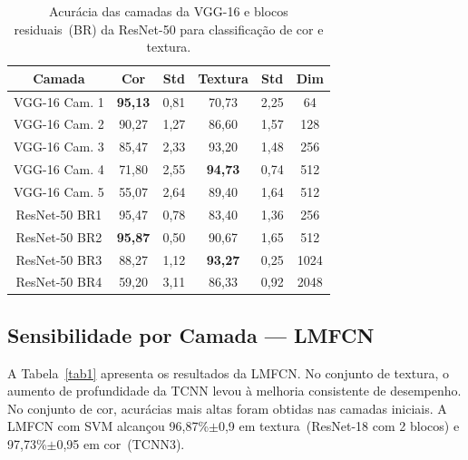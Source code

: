 \documentclass[letterpaper, 10 pt, conference]{ieeeconf}
\begin{document}
\begin{table}[htbp]
\caption{Acurácia das camadas da VGG-16 e blocos residuais~(BR) da ResNet-50
         para classificação de cor e textura.}
\begin{center}
\begin{tabular}{c|c|c|c|c|c}
\hline
\textbf{Camada} & \textbf{Cor} & \textbf{Std} & \textbf{Textura}
                & \textbf{Std} & \textbf{Dim} \\
\hline
VGG-16 Cam. 1 & \textbf{95,13} & 0,81 & 70,73 & 2,25 & 64   \\
VGG-16 Cam. 2 & 90,27 & 1,27 & 86,60 & 1,57 & 128  \\
VGG-16 Cam. 3 & 85,47 & 2,33 & 93,20 & 1,48 & 256  \\
VGG-16 Cam. 4 & 71,80 & 2,55 & \textbf{94,73} & 0,74 & 512  \\
VGG-16 Cam. 5 & 55,07 & 2,64 & 89,40 & 1,64 & 512  \\
ResNet-50 BR1 & 95,47 & 0,78 & 83,40 & 1,36 & 256  \\
ResNet-50 BR2 & \textbf{95,87} & 0,50 & 90,67 & 1,65 & 512  \\
ResNet-50 BR3 & 88,27 & 1,12 & \textbf{93,27} & 0,25 & 1024 \\
ResNet-50 BR4 & 59,20 & 3,11 & 86,33 & 0,92 & 2048 \\
\hline
\end{tabular}
\label{tab2}
\end{center}
\end{table}

\subsection{Sensibilidade por Camada — LMFCN}

A Tabela~\ref{tab1} apresenta os resultados da LMFCN.
No conjunto de textura, o aumento de profundidade da TCNN levou à melhoria
consistente de desempenho.
No conjunto de cor, acurácias mais altas foram obtidas nas camadas iniciais.
A LMFCN com SVM alcançou 96,87\%$\pm$0,9 em textura~(ResNet-18 com 2 blocos)
e 97,73\%$\pm$0,95 em cor~(TCNN3).
\end{document}
